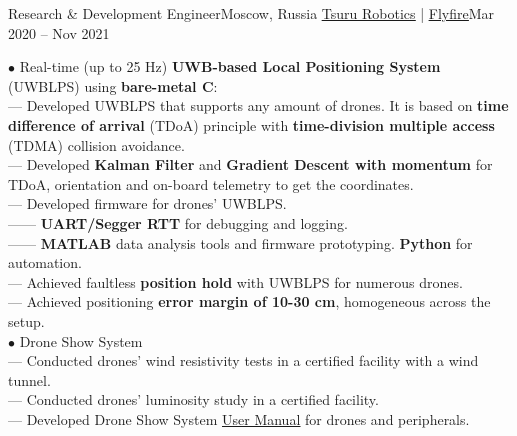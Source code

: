 \resumeSubheading
  {Research \& Development Engineer}{Moscow, Russia}
  {\href{https://tsuru.su/en/}{\underline{Tsuru Robotics}} | \href{http://flyfire.io/}{\underline{Flyfire}}}{Mar 2020 -- Nov 2021}
  \begin{itemize}[leftmargin=0in, label={}]
    \small{\item{
      {$\bullet$ Real-time (up to 25 Hz) \textbf{UWB-based Local Positioning System} (UWBLPS) using \textbf{bare-metal C}:}\\
      {— Developed UWBLPS that supports any amount of drones. It is based on \textbf{time difference of arrival} (TDoA) principle with \textbf{time-division multiple access} (TDMA) collision avoidance.}\\
      {— Developed \textbf{Kalman Filter} and  \textbf{Gradient Descent with momentum} for TDoA, orientation and on-board telemetry to get the coordinates.}\\
      {— Developed firmware for drones' UWBLPS.}\\
      {—— \textbf{UART/Segger RTT} for debugging and logging.}\\
      {—— \textbf{MATLAB} data analysis tools and firmware prototyping. \textbf{Python} for automation.}\\
      {— Achieved faultless \textbf{position hold} with UWBLPS for numerous drones.}\\
      {— Achieved positioning \textbf{error margin of 10-30 cm}, homogeneous across the setup.}\\
      {$\bullet$ Drone Show System}\\
      {— Conducted drones' wind resistivity tests in a certified facility with a wind tunnel.}\\
      {— Conducted drones' luminosity study in a certified facility.}\\
      {— Developed Drone Show System \href{https://bit.ly/3fa2qcd}{\underline{User Manual}} for drones and peripherals.}
    }}
  \end{itemize}